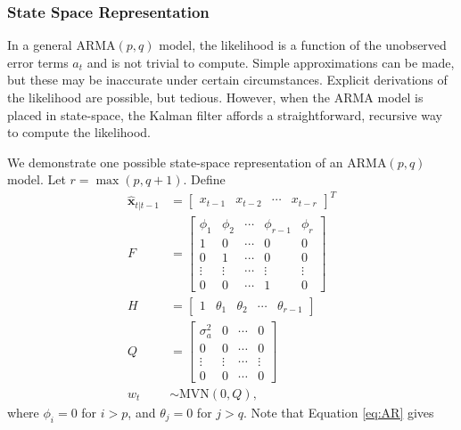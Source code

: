 \subsubsection*{State Space Representation}

In a general $\text{ARMA}(p,q)$ model, the likelihood is a function of the
unobserved error terms $a_t$ and is not trivial to compute.
Simple approximations can be made, but these may be inaccurate under certain
circumstances.
Explicit derivations of the likelihood are possible, but
tedious.
However, when the $\text{ARMA}$ model is placed in state-space, the
Kalman filter affords a straightforward, recursive way to compute the
likelihood.

We demonstrate one possible state-space representation of an $\text{ARMA}(p,q)$ model. Let
$r = \max(p, q+1)$. Define
\begin{align}
    \hat{\textbf{x}}_{t|t-1}&=\begin{bmatrix}x_{t-1}&x_{t-2}&\dotsb&x_{t-r}\end{bmatrix}^T\\
    F &= \begin{bmatrix}
        \phi_1 & \phi_2 & \cdots & \phi_{r-1} & \phi_r\\
        1 & 0 & \cdots & 0 & 0\\
        0 & 1 & \cdots & 0 & 0\\
        \vdots & \vdots & \cdots & \vdots & \vdots\\
        0 & 0 & \cdots & 1 & 0
    \end{bmatrix}\\
    H &= \begin{bmatrix}
        1 & \theta_1 & \theta_2 & \cdots & \theta_{r-1}
    \end{bmatrix}\\
    Q &= \begin{bmatrix}
        \sigma_a^2 & 0 & \cdots & 0\\
        0 & 0 & \cdots & 0\\
        \vdots & \vdots & \cdots & \vdots\\
        0 & 0 & \cdots & 0
    \end{bmatrix}\\
    w_t &\sim \text{MVN}(0, Q),
    \label{eqn:error}
\end{align}
where $\phi_i = 0$ for $i>p$, and $\theta_j = 0$ for $j > q$.
Note that Equation \ref{eq:AR} gives
